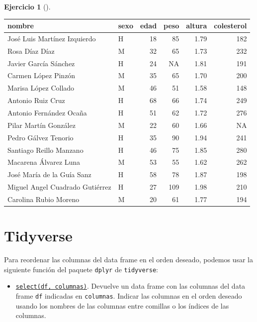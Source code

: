 \documentclass[
  a4paper,
]{scrreport}
\providecommand{\tightlist}{%
  \setlength{\itemsep}{0pt}\setlength{\parskip}{0pt}}\usepackage{longtable,booktabs,array}
\theoremstyle{definition}
\newtheorem{exercise}{Ejercicio}[chapter]
\theoremstyle{remark}
\begin{document}
\begin{exercise}[]
\begin{enumerate}
\begin{tcolorbox}
  \begin{longtable}[]{@{}llrrrr@{}}
  \toprule\noalign{}
  nombre & sexo & edad & peso & altura & colesterol \\
  \midrule\noalign{}
  \endhead
  \bottomrule\noalign{}
  \endlastfoot
  José Luis Martínez Izquierdo & H & 18 & 85 & 1.79 & 182 \\
  Rosa Díaz Díaz & M & 32 & 65 & 1.73 & 232 \\
  Javier García Sánchez & H & 24 & NA & 1.81 & 191 \\
  Carmen López Pinzón & M & 35 & 65 & 1.70 & 200 \\
  Marisa López Collado & M & 46 & 51 & 1.58 & 148 \\
  Antonio Ruiz Cruz & H & 68 & 66 & 1.74 & 249 \\
  Antonio Fernández Ocaña & H & 51 & 62 & 1.72 & 276 \\
  Pilar Martín González & M & 22 & 60 & 1.66 & NA \\
  Pedro Gálvez Tenorio & H & 35 & 90 & 1.94 & 241 \\
  Santiago Reillo Manzano & H & 46 & 75 & 1.85 & 280 \\
  Macarena Álvarez Luna & M & 53 & 55 & 1.62 & 262 \\
  José María de la Guía Sanz & H & 58 & 78 & 1.87 & 198 \\
  Miguel Angel Cuadrado Gutiérrez & H & 27 & 109 & 1.98 & 210 \\
  Carolina Rubio Moreno & M & 20 & 61 & 1.77 & 194 \\
  \end{longtable}

  \section{Tidyverse}

  Para reordenar las columnas del data frame en el orden deseado,
  podemos usar la siguiente función del paquete \texttt{dplyr} de
  \texttt{tidyverse}:

  \begin{itemize}
  \tightlist
  \item
    \href{https://dplyr.tidyverse.org/reference/select.html}{\texttt{select(df,\ columnas)}}.
    Devuelve un data frame con las columnas del data frame \texttt{df}
    indicadas en \texttt{columnas}. Indicar las columnas en el orden
    deseado usando los nombres de las columnas entre comillas o los
    índices de las columnas.
  \end{itemize}


\end{tcolorbox}
\end{enumerate}
\end{exercise}
\end{document}
